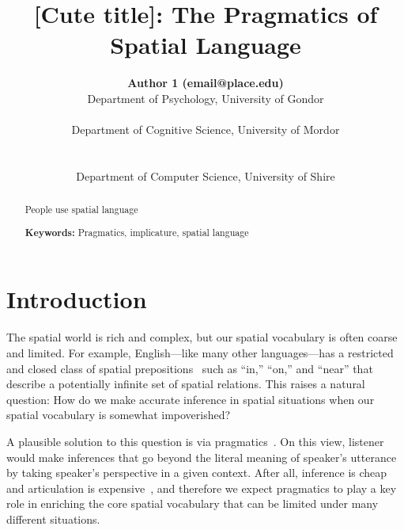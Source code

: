 \documentclass[10pt,letterpaper]{article}
\title{[Cute title]: The Pragmatics of Spatial Language}
\author{
{\large \bf Author 1 (email@place.edu)} \\
  Department of Psychology, University of Gondor\\
  \And{\large \bf Author 2 (email@place.edu)} \\
  Department of Cognitive Science, University of Mordor \\
  \\
 \AND{\large \bf Author 3 (email@people.edu)} \\
  Department of Computer Science, University of Shire\\
}
\begin{document}
\maketitle

\begin{abstract}
People use spatial language

\textbf{Keywords:} 
Pragmatics, implicature, spatial language
\end{abstract}

\section{Introduction}

The spatial world is rich and complex, but our spatial vocabulary is often coarse and limited. For example, English---like many other languages---has a restricted and closed class of spatial prepositions~\cite{talmy83,talmy00,landau93} such as ``in,'' ``on,'' and ``near'' that describe a potentially infinite set of spatial relations. This raises a natural question: How do we make accurate inference in spatial situations when our spatial vocabulary is somewhat impoverished?

A plausible solution to this question is via pragmatics~\cite{grice75,horn84}. On this view, listener would make inferences that go beyond the literal meaning of speaker's utterance by taking speaker's perspective in a given context. After all, inference is cheap and articulation is expensive~\cite{levinson00}, and therefore we expect pragmatics to play a key role in enriching the core spatial vocabulary that can be limited under many different situations. 
\end{document}
